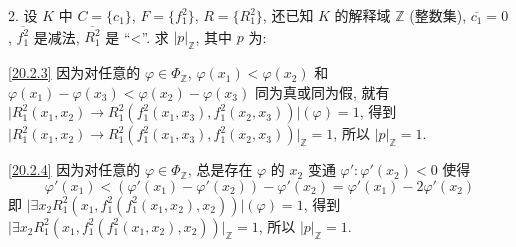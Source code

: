 \documentclass[boxes]{homework}
\begin{document}
\begin{problem}
2. 设 $K$ 中 $C = \{c_1\}$, $F=\{f_1^2\}$, $R=\{R_1^2\}$, 还已知 $K$ 的解释域 $\mathbb{Z}$ (整数集), $\overline{c_1} = 0$, $\overline{f_1^2}$ 是减法, $\overline{R_1^2}$ 是 ``<''. 求 $\lvert p\rvert_\mathbb{Z}$, 其中 $p$ 为:
\end{problem}
\begin{solution}
    \ref{20.2.3} 因为对任意的 $\varphi\in \Phi_\mathbb{Z}$, $\varphi(x_1) < \varphi(x_2)$ 和 $\varphi(x_1) - \varphi(x_3) < \varphi(x_2) - \varphi(x_3)$ 同为真或同为假, 就有 
    $\lvert R_1^2(x_1, x_2)\to R_1^2(f_1^2(x_1, x_3), f_1^2(x_2, x_3))\rvert(\varphi) = 1$,
    得到 $\lvert R_1^2(x_1, x_2)\to R_1^2(f_1^2(x_1, x_3), f_1^2(x_2, x_3))\rvert_\mathbb{Z} = 1$, 所以 $\lvert p\rvert_\mathbb{Z} = 1$.
    
    \ref{20.2.4} 因为对任意的 $\varphi\in \Phi_\mathbb{Z}$, 总是存在 $\varphi$ 的 $x_2$ 变通 $\varphi': \varphi'(x_2) < 0$ 使得 
    $$
        \varphi'(x_1) < (\varphi'(x_1) - \varphi'(x_2)) - \varphi'(x_2) = \varphi'(x_1) - 2\varphi'(x_2)
    $$
    即 $\lvert \exists x_2 R_1^2 (x_1, f_1^2(f_1^2(x_1, x_2), x_2))\rvert(\varphi) = 1$, 得到
    $\lvert \exists x_2 R_1^2 (x_1, f_1^2(f_1^2(x_1, x_2), x_2))\rvert_\mathbb{Z} = 1$, 所以 $\lvert p\rvert_\mathbb{Z} = 1$.
\end{solution}
\end{document}
